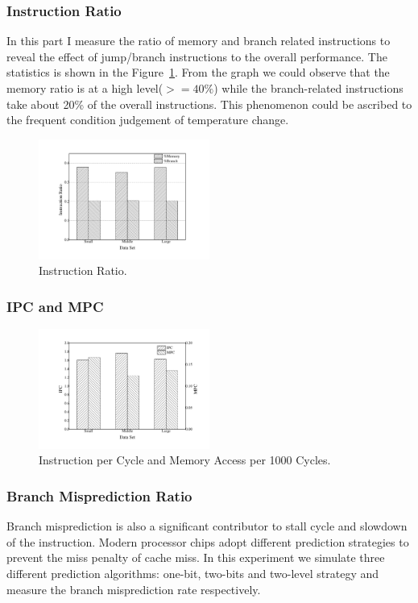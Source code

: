 \subsubsection{Instruction Ratio}
In this part I measure the ratio of memory and branch related instructions to reveal the effect of jump/branch instructions to the overall performance. The statistics is shown in the Figure~\ref{fig:ratio}. From the graph we could observe that the memory ratio is at a high level($>=40\%$) while the branch-related instructions take about 20\% of the overall instructions. This phenomenon could be ascribed to the frequent condition judgement of temperature change. 
\begin{figure}[ht]
\centering
\includegraphics[width=0.50\textwidth]{graph/ins_ratio.pdf}
\caption{Instruction Ratio.}
\label{fig:ratio}
\end{figure}

\subsubsection{IPC and MPC}
\begin{figure}[ht]
\centering
\includegraphics[width=0.50\textwidth]{graph/IPC_MPC.pdf}
\caption{Instruction per Cycle and Memory Access per 1000 Cycles.}
\label{fig:ipc_mpc}
\end{figure}

\subsubsection{Branch Misprediction Ratio }
Branch misprediction is also a significant contributor to stall cycle and slowdown of the instruction. Modern processor chips adopt different prediction strategies to prevent the miss penalty of cache miss. In this experiment we simulate three different prediction algorithms: one-bit, two-bits and two-level strategy and measure the branch misprediction rate respectively.

